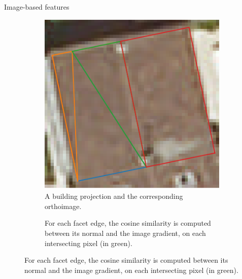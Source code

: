 \documentclass[10pt, export]{beamer}
\begin{document}
        \begin{frame}{Image-based features}
            \begin{figure}
                \begin{subfigure}{.48\textwidth}
                    \includegraphics[width=\textwidth]{images/radio_vector}
                    \caption{\label{fig::ortho_sup} A building projection and the corresponding orthoimage.}
                \end{subfigure}
                \begin{subfigure}{.48\textwidth}
                    
                    \caption{\label{fig::hist} For each facet edge, the cosine similarity is computed between its normal and the image gradient, on each intersecting pixel (in green).}
                \end{subfigure}
            \end{figure}
        \end{frame}
\end{document}
